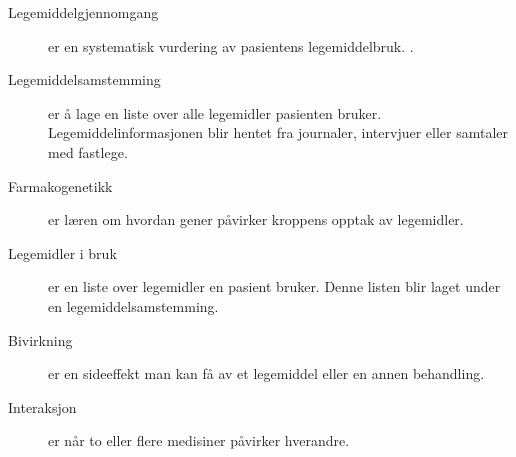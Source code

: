 
\begin{description}
\item[Legemiddelgjennomgang]
 er en systematisk vurdering av pasientens legemiddelbruk. \citep{Legemiddelverket_LMG}. 
\end{description}

\begin{description}
\item[Legemiddelsamstemming]
er å lage en liste over alle legemidler pasienten bruker. Legemiddelinformasjonen blir hentet fra journaler, intervjuer eller samtaler med fastlege.
\end{description}

\begin{description}
\item[Farmakogenetikk]
er læren om hvordan gener påvirker kroppens opptak av legemidler.
\end{description}


\begin{description}
\item[Legemidler i bruk]
er en liste over legemidler en pasient bruker. Denne listen blir laget under en legemiddelsamstemming.
\end{description}


\begin{description}
\item[Bivirkning]
er en sideeffekt man kan få av et legemiddel eller en annen behandling.
\end{description}

\begin{description}
\item [Interaksjon]
er når to eller flere medisiner påvirker hverandre.
\end{description}
